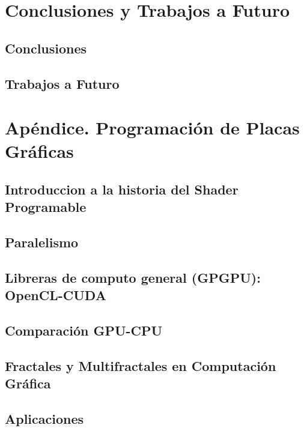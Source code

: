 \documentclass[spanish,a4paper,11pt,oneside,links]{report}
\begin{document}
\chapter{Conclusiones y Trabajos a Futuro}
\section{Conclusiones}
\section{Trabajos a Futuro}

\chapter{Apéndice. Programación de Placas Gráficas}
\section{Introduccion a la historia del Shader Programable}
\section{Paralelismo}
\section{Libreras de computo general (GPGPU): OpenCL-CUDA}
\section{Comparación GPU-CPU}
\section{Fractales y Multifractales en Computación Gráfica}
\section{Aplicaciones}





\end{document}
